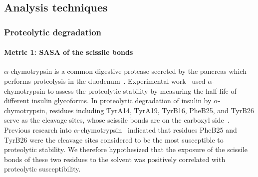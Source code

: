 \documentclass[9pt]{elife}
\providecommand{\DIFdelend}{} %
\begin{document}
\DIFdelend \subsection{Analysis techniques} \label{analysis_method}
\subsubsection{Proteolytic degradation}
\paragraph{Metric 1: SASA of the scissile bonds}
$\alpha$-chymotrypsin is a common digestive protease secreted by the pancreas which performs proteolysis in the duodenum~\cite{wilcox19705}. Experimental work~\cite{guan2018chemically} used $\alpha$-chymotrypsin to assess the proteolytic stability by measuring the half-life of different insulin glycoforms. In proteolytic degradation of insulin by $\alpha$-chymotrypsin, residues including TyrA14, TyrA19, TyrB16, PheB25, and TyrB26 serve as the cleavage sites, whose scissile bonds are on the carboxyl side~\cite{schilling1991degradation}. Previous research into $\alpha$-chymotrypsin~\cite{schilling1991degradation} indicated that residues PheB25 and TyrB26 were the cleavage sites considered to be the most susceptible to proteolytic stability. We therefore hypothesized that the exposure of the scissile bonds of these two residues to the solvent was positively correlated with proteolytic susceptibility. 
\end{document}
